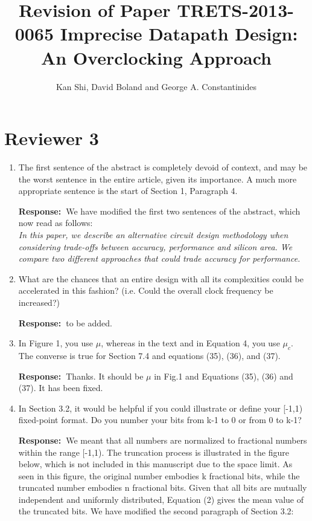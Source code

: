 \documentclass[a4paper, 11pt]{article}
\title{Revision of Paper TRETS-2013-0065 Imprecise Datapath Design: An Overclocking Approach}
\author{Kan Shi, David Boland and George A. Constantinides}
\date{}
\def\Response{\noindent \textbf{Response:~}}
\newcommand{\Question}[1]{\textcolor[rgb]{0.51,0.00,0.00}{#1}}
\newcommand{\PaperText}[1]{\emph{#1}}
\begin{document}
\maketitle

\section*{Reviewer 3}
\begin{enumerate}
  \item \Question{The first sentence of the abstract is completely devoid of context, and may be the worst sentence in the entire article, given its importance. A much more appropriate sentence is the start of Section 1, Paragraph 4.}
            
      \Response We have modified the first two sentences of the abstract, which now read as follows:\\
           
      \PaperText{In this paper, we describe an alternative circuit design methodology when considering trade-offs between accuracy, performance and silicon area. We compare two different approaches that could trade accuracy for performance.}\\

  \item \Question{What are the chances that an entire design with all its complexities could be accelerated in this fashion? (i.e. Could the overall clock frequency be increased?)}
            
      \Response to be added.\\
      
  \item \Question{In Figure 1, you use $\mu$, whereas in the text and in Equation 4, you use $\mu_c$.  The converse is true for Section 7.4 and equations (35), (36), and (37).}
      
      \Response Thanks. It should be $\mu$ in Fig.1 and Equations (35), (36) and (37). It has been fixed.\\
      
  \item \Question{In Section 3.2, it would be helpful if you could illustrate or define your [-1,1) fixed-point format. Do you number your bits from k-1 to 0 or from 0 to k-1?}
      
      \Response We meant that all numbers are normalized to fractional numbers within the range [-1,1). The truncation process is illustrated in the figure below, which is not included in this manuscript due to the space limit. As seen in this figure, the original number embodies k fractional bits, while the truncated number embodies n fractional bits. Given that all bits are mutually independent and uniformly distributed, Equation (2) gives the mean value of the truncated bits. We have modified the second paragraph of Section 3.2:\\
      

\end{enumerate}
\end{document}
